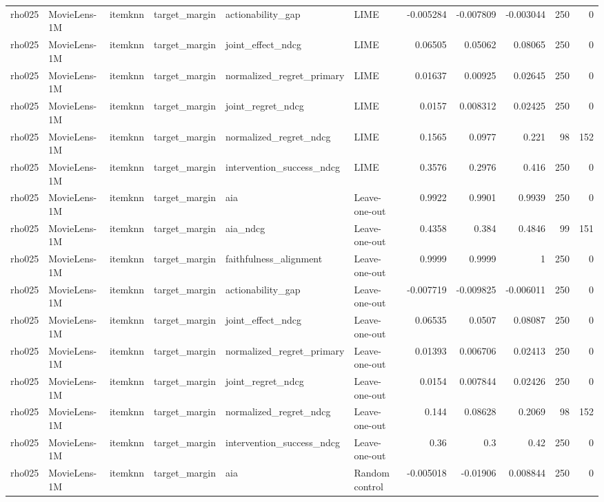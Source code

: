\begin{table}[t]
{\begin{tabular}{llllllrrrrr}
rho025 & MovieLens-1M & itemknn & target\_margin & actionability\_gap & LIME & -0.005284 & -0.007809 & -0.003044 & 250 & 0 \\
rho025 & MovieLens-1M & itemknn & target\_margin & joint\_effect\_ndcg & LIME & 0.06505 & 0.05062 & 0.08065 & 250 & 0 \\
rho025 & MovieLens-1M & itemknn & target\_margin & normalized\_regret\_primary & LIME & 0.01637 & 0.00925 & 0.02645 & 250 & 0 \\
rho025 & MovieLens-1M & itemknn & target\_margin & joint\_regret\_ndcg & LIME & 0.0157 & 0.008312 & 0.02425 & 250 & 0 \\
rho025 & MovieLens-1M & itemknn & target\_margin & normalized\_regret\_ndcg & LIME & 0.1565 & 0.0977 & 0.221 & 98 & 152 \\
rho025 & MovieLens-1M & itemknn & target\_margin & intervention\_success\_ndcg & LIME & 0.3576 & 0.2976 & 0.416 & 250 & 0 \\
rho025 & MovieLens-1M & itemknn & target\_margin & aia & Leave-one-out & 0.9922 & 0.9901 & 0.9939 & 250 & 0 \\
rho025 & MovieLens-1M & itemknn & target\_margin & aia\_ndcg & Leave-one-out & 0.4358 & 0.384 & 0.4846 & 99 & 151 \\
rho025 & MovieLens-1M & itemknn & target\_margin & faithfulness\_alignment & Leave-one-out & 0.9999 & 0.9999 & 1 & 250 & 0 \\
rho025 & MovieLens-1M & itemknn & target\_margin & actionability\_gap & Leave-one-out & -0.007719 & -0.009825 & -0.006011 & 250 & 0 \\
rho025 & MovieLens-1M & itemknn & target\_margin & joint\_effect\_ndcg & Leave-one-out & 0.06535 & 0.0507 & 0.08087 & 250 & 0 \\
rho025 & MovieLens-1M & itemknn & target\_margin & normalized\_regret\_primary & Leave-one-out & 0.01393 & 0.006706 & 0.02413 & 250 & 0 \\
rho025 & MovieLens-1M & itemknn & target\_margin & joint\_regret\_ndcg & Leave-one-out & 0.0154 & 0.007844 & 0.02426 & 250 & 0 \\
rho025 & MovieLens-1M & itemknn & target\_margin & normalized\_regret\_ndcg & Leave-one-out & 0.144 & 0.08628 & 0.2069 & 98 & 152 \\
rho025 & MovieLens-1M & itemknn & target\_margin & intervention\_success\_ndcg & Leave-one-out & 0.36 & 0.3 & 0.42 & 250 & 0 \\
rho025 & MovieLens-1M & itemknn & target\_margin & aia & Random control & -0.005018 & -0.01906 & 0.008844 & 250 & 0 \\

\end{tabular}}
\end{table}
